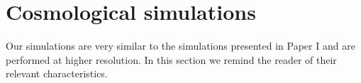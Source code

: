 \documentclass[numberedappendix]{emulateapj}
\begin{document}



\section{Cosmological simulations}

Our simulations are very similar to the simulations presented in Paper I and are performed at higher resolution. In this section we remind the reader of their relevant characteristics. 
\end{document}
